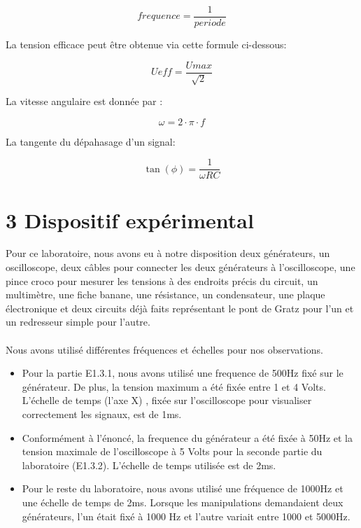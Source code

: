 \documentclass{report}
\begin{document}
\begin{equation}
   frequence = \frac{1}{periode}
\end{equation}

La tension efficace peut \^etre obtenue via cette formule ci-dessous:

\begin{equation}
   Ueff = \frac{Umax}{\sqrt{2}}
\end{equation}

La vitesse angulaire est donn\'ee par :

\begin{equation}
    \omega = 2\cdot \pi \cdot f   
\end{equation}

La tangente du d\'epahasage d'un signal:

\begin{equation}
    \tan(\phi) = \frac{1}{\omega RC}
\end{equation}

\section*{3 Dispositif exp\'erimental}
\hspace*{0.5cm}
Pour ce laboratoire, nous avons eu \`a notre disposition deux g\'en\'erateurs, un oscilloscope, deux c\^ables pour connecter les deux g\'en\'erateurs \`a l'oscilloscope, une pince croco pour mesurer les tensions \`a des endroits pr\'ecis du circuit, un multim\`etre, une fiche banane, une r\'esistance, un condensateur, une plaque \'electronique et deux circuits d\'ej\`a faits repr\'esentant le pont de Gratz pour l'un et un redresseur simple pour l'autre.
\\
\\
Nous avons utilis\'e diff\'erentes fr\'equences et \'echelles pour nos observations.
\begin{itemize}

\item Pour la partie E1.3.1, nous avons utilis\'e une frequence de 500Hz fix\'e sur le g\'en\'erateur. De plus, la tension maximum a \'et\'e fix\'ee entre 1 et 4 Volts. L'\'echelle de temps (l'axe X) , fix\'ee sur l'oscilloscope pour visualiser correctement les signaux, est de 1ms.
\item Conform\'ement \`a l'\'enonc\'e, la frequence du g\'en\'erateur a \'et\'e fix\'ee \`a 50Hz et la tension maximale de l'oscilloscope \`a 5 Volts pour la seconde partie du laboratoire (E1.3.2). L'\'echelle de temps utilis\'ee est de 2ms.
\item Pour le reste du laboratoire, nous avons utilis\'e une fr\'equence de 1000Hz et une \'echelle de temps de 2ms. Lorsque les manipulations demandaient deux g\'en\'erateurs, l'un \'etait fix\'e \`a 1000 Hz et l'autre variait entre 1000 et 5000Hz.
\end{itemize} 
\end{document}
